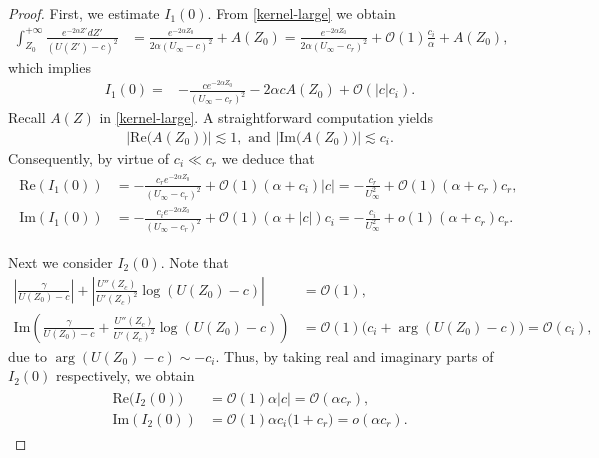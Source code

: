 \documentclass[reqno,11pt]{amsart}
\numberwithin{equation}{section}
\numberwithin{equation}{section}
\theoremstyle{plain}
\begin{document}
\begin{proof}
	First, we estimate $I_1(0)$. From \eqref{kernel-large} we obtain
	\begin{align*}%
			\int_{Z_0}^{+\infty}\frac{e^{-2\alpha Z'}dZ'}{(U(Z')-c)^2}
			&=\frac{e^{-2\alpha Z_0}}{2\alpha(U_\infty-c)^2}+A(Z_0)=\frac{e^{-2\alpha Z_0}}{2\alpha (U_\infty-c_r)^2}%
			+\mathcal{O}(1)\frac{c_i}{\alpha}+A(Z_0),
		\end{align*}
		which implies
		\begin{align*}
			I_1(0) =& -\frac{ce^{-2\alpha Z_0}}{(U_\infty-c_r)^2}%
			-2\alpha cA(Z_0)+\mathcal{O}(|c|c_i).
		\end{align*}
		Recall $A(Z)$ in \eqref{kernel-large}. A straightforward computation yields
		\begin{align*}%
			|\text{Re}\big(A(Z_0)\big)|\lesssim 1, \text{ and } |\text{Im}\big(A(Z_0)\big)|\lesssim c_i.
		\end{align*}
		Consequently, by virtue of $c_i\ll c_r$ we deduce that
		\begin{align}\label{I1-0-part}\begin{aligned}
				\text{Re}\left( I_1(0)\right) & =-\frac{c_re^{-2\alpha Z_0}}{ (U_\infty-c_r)^2}+\mathcal{O}(1)(\alpha+c_i)|c|=-\frac{c_r}{ U_\infty^2}+\mathcal{O}(1)(\alpha+c_r)c_r,\\%
				\text{Im}\left( I_1(0)\right) & =-\frac{c_ie^{-2\alpha Z_0}}{ (U_\infty-c_r)^2}+\mathcal{O}(1)(\alpha+|c|)c_i=-\frac{c_i}{ U_\infty^2}+o(1)(\alpha+c_r)c_r.
		\end{aligned}    \end{align}
		
		Next we consider $I_{2}(0)$. Note that
		\begin{align*}
			\left|\frac{\gamma}{U(Z_0)-c}\right|+\left|\frac{U''(Z_c)}{U'(Z_c)^2}\log(U(Z_0)-c)\right|&=\mathcal{O}(1), \\
			\text{Im}\left(\frac{\gamma}{U(Z_0)-c}+\frac{U''(Z_c)}{U'(Z_c)^2}\log(U(Z_0)-c)\right) &=\mathcal{O}(1)\big(c_i+\arg(U(Z_0)-c)\big)=\mathcal{O}(c_i),
		\end{align*}
		due to $\arg(U(Z_0)-c)\sim -c_i$.  Thus, by taking real and imaginary parts of $I_2(0)$ respectively, we obtain
		\begin{align}\label{I2-0-part}\begin{aligned}
				\text{Re}\big(I_{2}(0)\big)&=\mathcal{O}(1)\alpha |c|=\mathcal{O}(\alpha c_r),\\
				\text{Im}(I_{2}(0))&=\mathcal{O}(1)\alpha c_i\Big(1+ c_r\Big)
				=o(\alpha c_r).
		\end{aligned}\end{align}
		

\end{proof}
\end{document}
